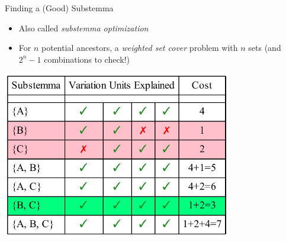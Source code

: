 \documentclass[10pt]{beamer}
\begin{document}
	\begin{frame}{Finding a (Good) Substemma}
		\begin{itemize}
			\item Also called \emph{substemma optimization}
			\item For $n$ potential ancestors, a \emph{weighted set cover} problem with $n$ sets (and $2^n - 1$ combinations to check!)
		\end{itemize}
		\begin{center}
			\includegraphics[width=0.75\textwidth]{../img/weighted-set-cover.pdf}
		\end{center}
	\end{frame}
\end{document}
